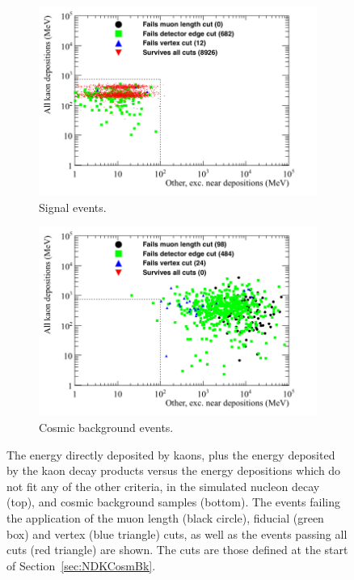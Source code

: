 \begin{figure}
  \centering
  \begin{subfigure}{0.8\textwidth}
    \includegraphics[width=\textwidth]{NucleonDecay_AllKaon_vs_Other_Can}
    \caption{Signal events.}
    \label{fig:NDK_AllKaon_Other_EDist_Sig}
  \end{subfigure}
  \begin{subfigure}{0.8\textwidth}
    \includegraphics[width=\textwidth]{CosmicBackground_AllKaon_vs_Other_Can}
    \caption{Cosmic background events.}
    \label{fig:NDK_AllKaon_Other_EDist_Cosmo}
  \end{subfigure}
  \caption[The energy directly deposited by kaons, plus the energy deposited by the kaon decay products versus the energy depositions which do not fit any of the other criteria, in the simulated nucleon decay and cosmic background samples]
          {The energy directly deposited by kaons, plus the energy deposited by the kaon decay products versus the energy depositions which do not fit any of the other criteria, in the simulated nucleon decay (top), and cosmic background samples (bottom). The events failing the application of the muon length (black circle), fiducial (green box) and vertex (blue triangle) cuts, as well as the events passing all cuts (red triangle) are shown. The cuts are those defined at the start of Section~\ref{sec:NDKCosmBk}.}
  \label{fig:NDK_AllKaon_Other_EDist}
\end{figure}

